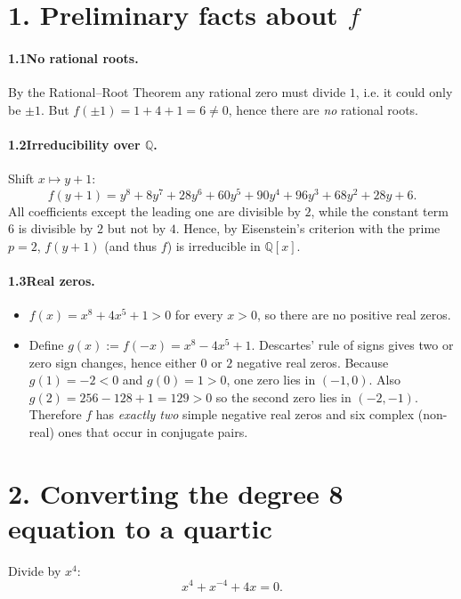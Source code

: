 \documentclass[12pt]{article}
\title{}
\author{Jerich Lee}
\date{\today}
\theoremstyle{definition} %
\theoremstyle{plain} %
\begin{document}
\maketitle
\section*{1.  Preliminary facts about $f$}

\paragraph{1.1\;No rational roots.}
By the Rational–Root Theorem any rational zero must divide $1$, i.e. it could only be
$\pm1$.  But $f(\pm1)=1+4+1=6\neq0$, hence there are \emph{no} rational roots.

\paragraph{1.2\;Irreducibility over $\mathbb{Q}$.}
Shift $x\mapsto y+1$:
\[
f(y+1)=y^{8}+8y^{7}+28y^{6}+60y^{5}+90y^{4}+96y^{3}+68y^{2}+28y+6.
\]
All coefficients except the leading one are divisible by $2$, while the constant
term $6$ is divisible by $2$ but not by $4$.  
Hence, by Eisenstein’s criterion with the prime $p=2$, $f(y+1)$ (and thus $f$)
is irreducible in $\mathbb{Q}[x]$.

\paragraph{1.3\;Real zeros.}
\begin{itemize}
  \item $f(x)=x^{8}+4x^{5}+1>0$ for every $x>0$, so there are no positive real zeros.
  \item Define $g(x):=f(-x)=x^{8}-4x^{5}+1$.
        Descartes’ rule of signs gives two or zero sign changes,
        hence either $0$ or $2$ negative real zeros.
        Because $g(1)=-2<0$ and $g(0)=1>0$, one
        zero lies in $(-1,0)$.  
        Also $g(2)=256-128+1=129>0$ so the second zero lies in $(-2,-1)$.
        Therefore $f$ has \emph{exactly two} simple negative real zeros and six
        complex (non-real) ones that occur in conjugate pairs.
\end{itemize}
\section*{2.  Converting the degree 8 equation to a quartic}

Divide by $x^{4}$:
\[
x^{4}+x^{-4}+4x=0.
\tag{$\star$}
\]
\end{document}
